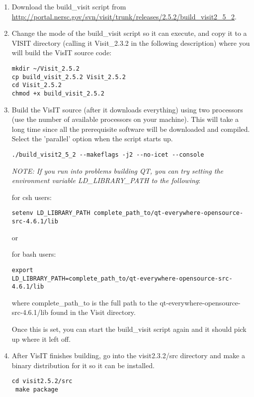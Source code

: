 \documentclass[11pt,fleqn]{book} %
\begin{document}
\begin{enumerate}
\item Download the build\_visit script from
  \url{http://portal.nersc.gov/svn/visit/trunk/releases/2.5.2/build_visit2_5_2}.



\item Change the mode of the build\_visit script so it can execute, and
  copy it to a VISIT directory (calling it Visit\_2.3.2 in the
  following description) where you will build the VisIT source code:
\begin{lstlisting}
mkdir ~/Visit_2.5.2
cp build_visit_2.5.2 Visit_2.5.2
cd Visit_2.5.2
chmod +x build_visit_2.5.2
\end{lstlisting}

\item Build the VisIT source (after it downloads everything) using two
  processors (use the number of available processors on your
  machine). This will take a long time since all the prerequisite
  software will be downloaded and compiled. Select the 'parallel'
  option when the script starts up. 

\begin{lstlisting}
./build_visit2_5_2 --makeflags -j2 --no-icet --console
\end{lstlisting}

\emph{NOTE: If you run into problems building QT, you can try setting
  the environment variable LD\_LIBRARY\_PATH to the following}:

for csh users:
\begin{lstlisting}
setenv LD_LIBRARY_PATH complete_path_to/qt-everywhere-opensource-src-4.6.1/lib
\end{lstlisting}

or

for bash users:
\begin{lstlisting}
export
LD_LIBRARY_PATH=complete_path_to/qt-everywhere-opensource-src-4.6.1/lib
\end{lstlisting}

where complete\_path\_to is the full path to the
qt-everywhere-opensource-src-4.6.1/lib found in the Visit directory.

Once this is set, you can start the build\_visit script again and it
should pick up where it left off.

\item After VisIT finishes building, go into the visit2.3.2/src
  directory and make a binary distribution for it so it can be
  installed.  
\begin{lstlisting}
cd visit2.5.2/src
 make package 
\end{lstlisting}


\end{enumerate}
\end{document}
